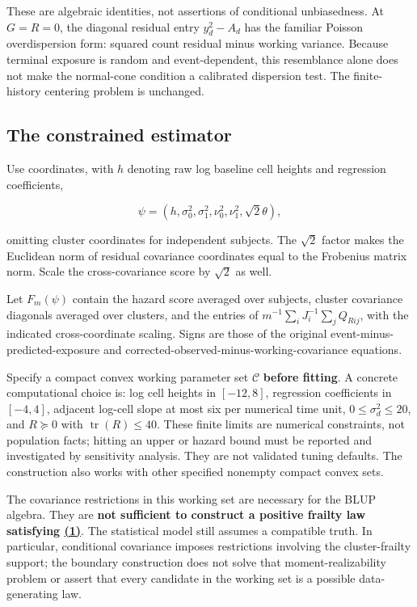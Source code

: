 \documentclass[11pt]{article}
\begin{document}
These are algebraic identities, not assertions of conditional unbiasedness. At \(G=R=0\), the diagonal residual entry \(y_d^2-A_d\) has the familiar Poisson overdispersion form: squared count residual minus working variance. Because terminal exposure is random and event-dependent, this resemblance alone does not make the normal-cone condition a calibrated dispersion test. The finite-history centering problem is unchanged.

\subsection{The constrained estimator}\label{sec:3.6}

Use coordinates, with \(h\) denoting raw log baseline cell heights and regression coefficients,

\begin{equation*}
\psi=(h,\sigma_0^2,\sigma_1^2,\nu_0^2,\nu_1^2,\sqrt2\theta),
\tag{34}\label{eq:34}
\end{equation*}

omitting cluster coordinates for independent subjects. The \(\sqrt2\) factor makes the Euclidean norm of residual covariance coordinates equal to the Frobenius matrix norm. Scale the cross-covariance score by \(\sqrt2\) as well.

Let \(F_m(\psi)\) contain the hazard score averaged over subjects, cluster covariance diagonals averaged over clusters, and the entries of \(m^{-1}\sum_iJ_i^{-1}\sum_jQ_{Rij}\), with the indicated cross-coordinate scaling. Signs are those of the original event-minus-predicted-exposure and corrected-observed-minus-working-covariance equations.

Specify a compact convex working parameter set \(\mathcal C\) \textbf{before fitting}. A concrete computational choice is: log cell heights in \([-12,8]\), regression coefficients in \([-4,4]\), adjacent log-cell slope at most six per numerical time unit, \(0\leq\sigma_d^2\leq20\), and \(R\succeq0\) with \(\operatorname{tr}(R)\leq40\). These finite limits are numerical constraints, not population facts; hitting an upper or hazard bound must be reported and investigated by sensitivity analysis. They are not validated tuning defaults. The construction also works with other specified nonempty compact convex sets.

The covariance restrictions in this working set are necessary for the BLUP algebra. They are \textbf{not sufficient to construct a positive frailty law satisfying \hyperref[eq:1]{(1)}}. The statistical model still assumes a compatible truth. In particular, conditional covariance imposes restrictions involving the cluster-frailty support; the boundary construction does not solve that moment-realizability problem or assert that every candidate in the working set is a possible data-generating law.
\end{document}
